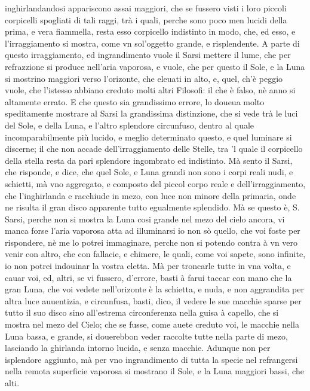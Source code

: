 \documentclass[11pt,twoside,openany]{book}
\begin{document}
inghirlandandosi appariscono assai maggiori, che se fussero visti i loro piccoli corpicelli spogliati di tali raggi, trà i quali, perche sono poco men lucidi della prima, e vera fiammella, resta esso corpicello indistinto in modo, che, ed esso, e l'irraggiamento si mostra, come vn sol'oggetto grande, e risplendente. A parte di questo irraggiamento, ed ingrandimento vuole il Sarsi mettere il lume, che per refrazzione si produce nell'aria vaporosa, e vuole, che per questo il Sole, e la Luna si mostrino maggiori verso l'orizonte, che eleuati in alto, e, quel, ch'è peggio vuole, che l'istesso abbiano creduto molti altri Filosofi: il che è falso, nè anno si altamente errato. E che questo sia grandissimo errore, lo doueua molto speditamente mostrare al Sarsi la grandissima distinzione, che si vede trà le luci del Sole, e della Luna, e l'altro splendore circunfuso, dentro al quale incomparabilmente più lucido, e meglio determinato questo, e quel luminare si discerne; il che non accade dell'irraggiamento delle Stelle, tra 'l quale il corpicello della stella resta da pari splendore ingombrato ed indistinto. Mà sento il Sarsi, che risponde, e dice, che quel Sole, e Luna grandi non sono i corpi reali nudi, e schietti, mà vno aggregato, e composto del piccol corpo reale e dell'irraggiamento, che l'inghirlanda e racchiude in mezo, con luce non minore della primaria, onde ne risulta il gran disco apparente tutto egualmente splendido. Mà se questo è, S. Sarsi, perche non si mostra la Luna cosi grande nel mezo del cielo ancora, vi manca forse l'aria vaporosa atta ad illuminarsi io non sò quello, che voi foste per rispondere, nè me lo potrei immaginare, perche non si potendo contra à vn vero venir con altro, che con fallacie, e chimere, le quali, come voi sapete, sono infinite, io non potrei indouinar la vostra eletta. Mà per troncarle tutte in vna volta, e cauar voi, ed, altri, se vi fussero, d'errore, basti à farui taccar con mano che la gran Luna, che voi vedete nell'orizonte è la schietta, e nuda, e non aggrandita per altra luce auuentizia, e circunfusa, basti, dico, il vedere le sue macchie sparse per tutto il suo disco sino all'estrema circonferenza nella guisa à capello, che si mostra nel mezo del Cielo; che se fusse, come auete creduto voi, le macchie nella Luna bassa, e grande, si douerebbon veder raccolte tutte nella parte di mezo, lasciando la ghirlanda intorno lucida, e senza macchie. Adunque non per isplendore aggiunto, mà per vno ingrandimento di tutta la specie nel refrangersi nella remota superficie vaporosa si mostrano il Sole, e la Luna maggiori bassi, che alti.
\end{document}
